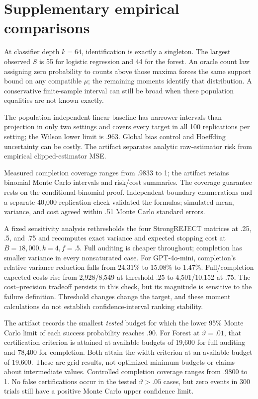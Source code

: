 \documentclass[conference]{IEEEtran}
\begin{document}


\appendices
\section{Supplementary empirical comparisons}\label{app:empirical-detail}

At classifier depth $k=64$, identification is exactly a singleton. The largest observed $S$ is 55 for logistic regression and 44 for the forest. An oracle count law assigning zero probability to counts above those maxima forces the same support bound on any compatible $\mu$; the remaining moments identify that distribution. A conservative finite-sample interval can still be broad when these population equalities are not known exactly.

The population-independent linear baseline has narrower intervals than projection in only two settings and covers every target in all 100 replications per setting; the Wilson lower limit is .963. Global bias control and Hoeffding uncertainty can be costly. The artifact separates analytic raw-estimator risk from empirical clipped-estimator MSE.

Measured completion coverage ranges from .9833 to 1; the artifact retains binomial Monte Carlo intervals and risk/cost summaries. The coverage guarantee rests on the conditional-binomial proof. Independent boundary enumerations and a separate 40,000-replication check validated the formulas; simulated mean, variance, and cost agreed within .51 Monte Carlo standard errors.

A fixed sensitivity analysis rethresholds the four StrongREJECT matrices at .25, .5, and .75 and recomputes exact variance and expected stopping cost at $B=18{,}000,k=4,f=.5$. Full auditing is cheaper throughout; completion has smaller variance in every nonsaturated case. For GPT-4o-mini, completion's relative variance reduction falls from 24.31\% to 15.08\% to 1.47\%. Full/completion expected costs rise from 2,928/8,549 at threshold .25 to 4,501/10,152 at .75. The cost--precision tradeoff persists in this check, but its magnitude is sensitive to the failure definition. Threshold changes change the target, and these moment calculations do not establish confidence-interval ranking stability.

The artifact records the smallest \emph{tested} budget for which the lower 95\% Monte Carlo limit of each success probability reaches .90. For Forest at $\vartheta=.01$, that certification criterion is attained at available budgets of 19,600 for full auditing and 78,400 for completion. Both attain the width criterion at an available budget of 19,600. These are grid results, not optimized minimum budgets or claims about intermediate values. Controlled completion coverage ranges from .9800 to 1. No false certifications occur in the tested $\vartheta>.05$ cases, but zero events in 300 trials still have a positive Monte Carlo upper confidence limit.
\end{document}
